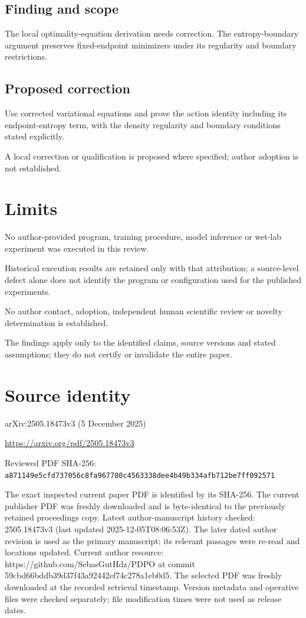 \documentclass[11pt]{article}
\begin{document}
\subsection*{Finding and scope}

The local optimality-equation derivation needs correction. The entropy-boundary argument preserves fixed-endpoint minimizers under its regularity and boundary restrictions.

\subsection*{Proposed correction}

Use corrected variational equations and prove the action identity including its endpoint-entropy term, with the density regularity and boundary conditions stated explicitly.

A local correction or qualification is proposed where specified; author adoption is not established.

\section*{Limits}

No author-provided program, training procedure, model inference or wet-lab experiment was executed in this review.\par

Historical execution results are retained only with that attribution; a source-level defect alone does not identify the program or configuration used for the published experiments.\par

No author contact, adoption, independent human scientific review or novelty determination is established.\par

The findings apply only to the identified claims, source versions and stated assumptions; they do not certify or invalidate the entire paper.\par

\section*{Source identity}

arXiv:2505.18473v3 (5 December 2025)

\url{https://arxiv.org/pdf/2505.18473v3}

Reviewed PDF SHA-256: \nolinkurl{a871149e5cfd737056c8fa967780c4563338dee4b49b334afb712be7ff092571}

The exact inspected current paper PDF is identified by its SHA-256. The current publisher PDF was freshly downloaded and is byte-identical to the previously retained proceedings copy. Latest author-manuscript history checked: 2505.18473v3 (last updated 2025-12-05T08:06:53Z). The later dated author revision is used as the primary manuscript; its relevant passages were re-read and locations updated. Current author resource: https://github.com/SebasGutHdz/PDPO at commit 59cbd66bddb39d37f43a92442ef74c278a1eb0d5.  The selected PDF was freshly downloaded at the recorded retrieval timestamp. Version metadata and operative files were checked separately; file modification times were not used as release dates.
\end{document}
